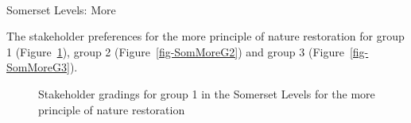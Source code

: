 \documentclass[
  12pt,
  letterpaper,
  DIV=11,
  numbers=noendperiod]{scrartcl}
\makeatletter
\let\oldparagraph\paragraph
\renewcommand{\paragraph}{
    \@ifstar
      \xxxParagraphStar
      \xxxParagraphNoStar
  }
\newcommand{\xxxParagraphStar}[1]{\oldparagraph*{#1}\mbox{}}
\newcommand{\xxxParagraphNoStar}[1]{\oldparagraph{#1}\mbox{}}
\makeatother
\begin{document}
\newpage{}

\paragraph{Somerset Levels: More}\label{somerset-levels-more}

The stakeholder preferences for the more principle of nature restoration
for group 1 (Figure~\ref{fig-SomMoreG1}), group 2
(Figure~\ref{fig-SomMoreG2}) and group 3 (Figure~\ref{fig-SomMoreG3}).

\begin{figure}[H]


\caption{\label{fig-SomMoreG1}Stakeholder gradings for group 1 in the
Somerset Levels for the more principle of nature restoration}

\end{figure}%
\end{document}
